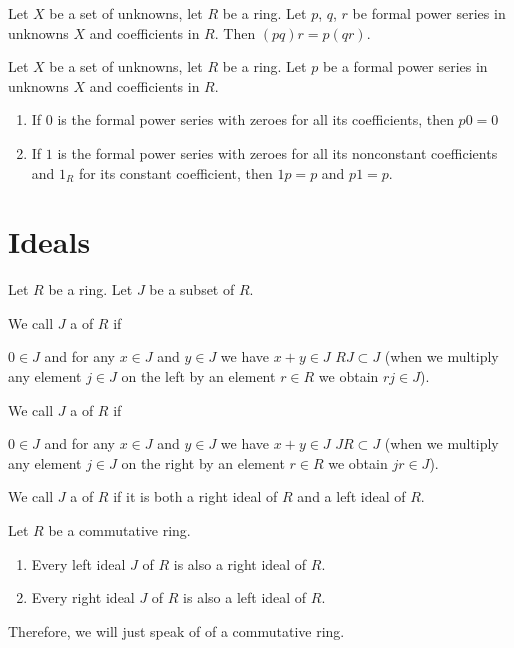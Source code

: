 \begin{theorem}
Let $X$ be a set of unknowns, let $R$ be a ring. Let $p$, $q$, $r$ be
formal power series in unknowns $X$ and coefficients in $R$. Then
$(pq)r=p(qr)$.
\end{theorem}

\begin{theorem}
Let $X$ be a set of unknowns, let $R$ be a ring. Let $p$ be a
formal power series in unknowns $X$ and coefficients in $R$. 
\begin{enumerate}
\item If $0$ is the formal power series with zeroes for all its
  coefficients, then $p0=0$
\item If $1$ is the formal power series with zeroes for all its
  nonconstant coefficients and $1_{R}$ for its constant coefficient,
  then $1p=p$ and $p1=p$.
\end{enumerate}
\end{theorem}


\section{Ideals}

\begin{definition}
Let $R$ be a ring. Let $J$ be a subset of $R$.

We call $J$ a  of $R$ if
\begin{itemize}
 $0\in J$ and
 for any $x\in J$ and $y\in J$ we have
  $x+y\in J$
 $RJ\subset J$ (when we multiply any
element $j\in J$ on the left by an element $r\in R$ we obtain $rj\in J$).
\end{itemize}

\noindent%
We call $J$ a  of $R$ if
\begin{itemize}
 $0\in J$ and
 for any $x\in J$ and $y\in J$ we have
  $x+y\in J$
 $JR\subset J$ (when we
  multiply any element $j\in J$ on the right by an element $r\in R$ we obtain $jr\in J$).
\end{itemize}

\noindent%
We call $J$ a  of $R$ if it is both a right
ideal of $R$ and a left ideal of $R$.
\end{definition}

\begin{theorem}
Let $R$ be a commutative ring.
\begin{enumerate}
\item Every left ideal $J$ of $R$ is also a right ideal of $R$.
\item Every right ideal $J$ of $R$ is also a left ideal of $R$.
\end{enumerate}
Therefore, we will just speak of  of a commutative ring.
\end{theorem}

